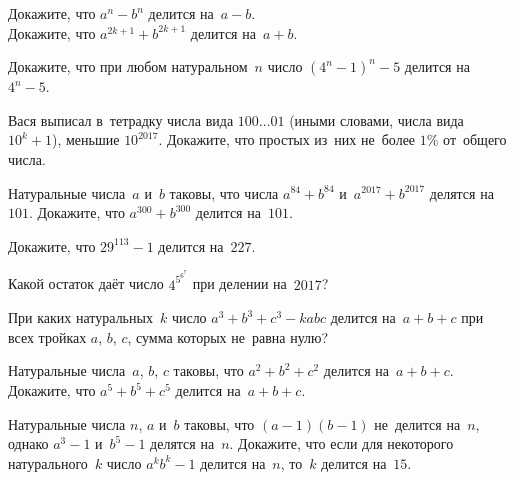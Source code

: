 


\begin{problems}

\item
\subproblem
Докажите, что $a^{n} - b^{n}$ делится на~$a - b$.
\\
\subproblem
Докажите, что $a^{2k+1} + b^{2k+1}$ делится на~$a + b$.


\item
Докажите, что при любом натуральном~$n$ число $(4^{n} - 1)^{n} - 5$ делится
на~$4^{n} - 5$.

\item
Вася выписал в~тетрадку числа вида $100{\ldots}01$ (иными словами, числа вида
$10^k+1$), меньшие $10^{2017}$.
Докажите, что простых из~них не~более $1\%$ от~общего числа.


\item
Натуральные числа~$a$ и~$b$ таковы, что числа $a^{84} + b^{84}$
и~$a^{2017} + b^{2017}$ делятся на~$101$.
Докажите, что $a^{300} + b^{300}$ делится на~$101$.

\item
Докажите, что $29^{113} - 1$ делится на~$227$.

\item
Какой остаток даёт число $4^{5^{6^7}}$ при делении на~$2017$?

\item
При каких натуральных~$k$ число $a^3 + b^3 + c^3 - k a b c$ делится
на~$a + b + c$ при всех тройках $a$, $b$, $c$, сумма которых не~равна нулю?

\item
Натуральные числа~$a$, $b$, $c$ таковы, что $a^2 + b^2 + c^2$ делится
на~$a + b + c$.
Докажите, что $a^5 + b^5 + c^5$ делится на~$a + b + c$.

\item
Натуральные числа $n$, $a$ и~$b$ таковы, что $(a - 1) (b - 1)$ не~делится
на~$n$, однако $a^{3} - 1$ и~$b^{5} - 1$ делятся на~$n$.
Докажите, что если для некоторого натурального~$k$ число $a^{k} b^{k} - 1$
делится на~$n$, то~$k$ делится на~$15$.


\end{problems}

